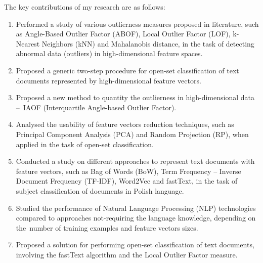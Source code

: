 The key contributions of my research are as follows:
\begin{enumerate}
    \item Performed a study of various outlierness measures proposed in literature, such as Angle-Based Outlier Factor (ABOF), Local Outlier Factor (LOF), k-Nearest Neighbors (kNN) and Mahalanobis distance, in the task of detecting abnormal data (outliers) in high-dimensional feature spaces.

    \item Proposed a generic two-step procedure for open-set classification of text documents represented by high-dimensional feature vectors.

    \item Proposed a new method to quantity the outlierness in high-dimensional data –~IAOF (Interquartile Angle-based Outlier Factor).

    \item Analysed the usability of feature vectors reduction techniques, such as Principal Component Analysis (PCA) and Random Projection (RP), when applied in the task of open-set classification.

    \item Conducted a study on different approaches to represent text documents with feature vectors, such as Bag of Words (BoW), Term Frequency – Inverse Document Frequency (TF-IDF), Word2Vec and fastText, in the task of subject classification of documents in Polish language.

    \item Studied the performance of Natural Language Processing (NLP) technologies compared to approaches not-requiring the language knowledge, depending on the~number of training examples and feature vectors sizes.

    \item Proposed a solution for performing open-set classification of text documents, involving the fastText algorithm and the Local Outlier Factor measure.


\end{enumerate}
